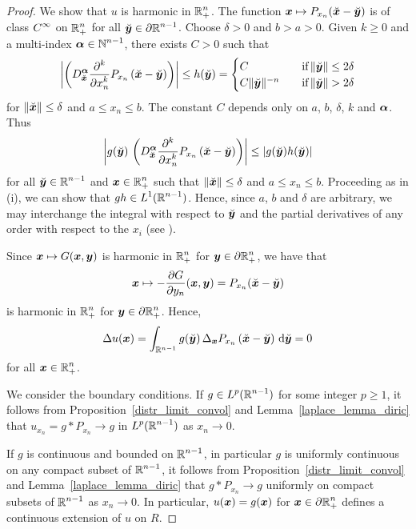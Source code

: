 \begin{proof}
 We show that $u$ is harmonic in $\DS \RR^n_+$.
The function $\VEC{x} \mapsto P_{x_n}( \breve{\VEC{x}} - \breve{\VEC{y}} )$
is of class $\DS C^\infty$ on $\DS \RR^n_+$ for all
$\DS \breve{\VEC{y}} \in \partial \RR^{n-1}$.
Choose $\delta>0$ and $b>a>0$.  Given $k\geq 0$ and a multi-index
$\DS \VEC{\alpha} \in \NN^{n-1}$, there exists $C>0$ such that
\[
\left| \left( D^{\VEC{\alpha}}_{\breve{\VEC{x}}}
\pdfdxn{ P_{x_n}\left(\breve{\VEC{x}} - \breve{\VEC{y}}\right)}{x_n}{k} \right)
\right| 
\leq h(\breve{\VEC{y}}) =
\begin{cases}
C & \quad \text{if} \left\|\breve{\VEC{y}}\right\| \leq 2\delta \\
C\|\breve{\VEC{y}}\|^{-n} & \quad \text{if}
\left\|\breve{\VEC{y}}\right\| > 2\delta
\end{cases}
\]
for $\|\breve{\VEC{x}}\|\leq \delta$ and $a \leq x_n \leq b$.   The constant
$C$ depends only on $a$, $b$, $\delta$, $k$ and $\VEC{\alpha}$.  Thus
\[
\left|g(\breve{\VEC{y}})\, \left( D^{\VEC{\alpha}}_{\breve{\VEC{x}}}
\pdfdxn{ P_{x_n}\left(\breve{\VEC{x}} - \breve{\VEC{y}}\right)}{x_n}{k} \right)
\right| \leq \left|g(\breve{\VEC{y}})h(\breve{\VEC{y}})\right|
\]
for all $\DS \breve{\VEC{y}} \in \RR^{n-1}$ and
$\DS \VEC{x} \in \RR^n_+$ such that
$\|\breve{\VEC{x}}\|\leq \delta$ and $a \leq x_n \leq b$.  Proceeding
as in (i), we can show that $\DS g h \in L^1(\RR^{n-1})$.
Hence, since $a$, $b$ and $\delta$ are arbitrary, we may interchange the
integral with respect to $\breve{\VEC{y}}$ and the partial
derivatives of any order with respect to the $x_i$ (see \cite{Flem}).

Since $\VEC{x} \mapsto G(\VEC{x}, \VEC{y})$ is harmonic in
$\DS \RR^n_+$ for
$\DS \VEC{y} \in \partial \RR^n_+$, we have that
\[
\VEC{x} \mapsto -\pdydx{G}{y_n}(\VEC{x},\VEC{y})
= P_{x_n}(\breve{\VEC{x}}-\breve{\VEC{y}})
\]
is harmonic in $\DS \RR^n_+$ for
$\DS \VEC{y} \in \partial \RR^n_+$.
Hence,
\[
\Delta u(\VEC{x}) = 
\int_{\RR^{n-1}} g(\breve{\VEC{y}})\,
\Delta_{\VEC{x}} P_{x_n}\left(\breve{\VEC{x}} - \breve{\VEC{y}}\right)
\dx{\breve{\VEC{y}}} = 0
\]
for all $\DS \VEC{x} \in \RR^n_+$.

 We consider the boundary conditions.
If $\DS g\in L^p(\RR^{n-1})$ for some integer $p \geq 1$, it
follows from Proposition~\ref{distr_limit_convol} and
Lemma~\ref{laplace_lemma_diric} that
$u_{x_n} = g \ast P_{x_n} \rightarrow g$ in $\DS L^p(\RR^{n-1})$ as
$x_n \rightarrow 0$.

 If $g$ is continuous and bounded on $\DS \RR^{n-1}$, in
particular $g$ is uniformly continuous on any compact subset of
$\DS \RR^{n-1}$, it follows from
Proposition~\ref{distr_limit_convol} and
Lemma~\ref{laplace_lemma_diric} that
$g \ast P_{x_n} \rightarrow g$ uniformly on compact subsets of
$\DS \RR^{n-1}$ as $x_n \rightarrow 0$.  In particular,
$u(\VEC{x}) = g(\VEC{x})$ for
$\DS \VEC{x} \in \partial \RR^n_+$ defines a
continuous extension of $u$ on $R$.
\end{proof}

